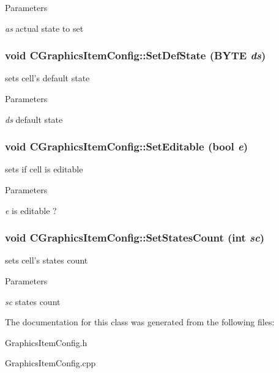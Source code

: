 \begin{DoxyParams}{Parameters}
\item[{\em as}]actual state to set \end{DoxyParams}
\hypertarget{classCGraphicsItemConfig_ace5b4e90b7f89113005c2b8340e40ddb}{
\subsubsection[{SetDefState}]{\setlength{\rightskip}{0pt plus 5cm}void CGraphicsItemConfig::SetDefState (BYTE {\em ds})}}
\label{classCGraphicsItemConfig_ace5b4e90b7f89113005c2b8340e40ddb}
sets cell's default state


\begin{DoxyParams}{Parameters}
\item[{\em ds}]default state \end{DoxyParams}
\hypertarget{classCGraphicsItemConfig_a63436e6b3eb1e9ffe7ba7b43a9b89442}{
\subsubsection[{SetEditable}]{\setlength{\rightskip}{0pt plus 5cm}void CGraphicsItemConfig::SetEditable (bool {\em e})}}
\label{classCGraphicsItemConfig_a63436e6b3eb1e9ffe7ba7b43a9b89442}
sets if cell is editable


\begin{DoxyParams}{Parameters}
\item[{\em e}]is editable ? \end{DoxyParams}
\hypertarget{classCGraphicsItemConfig_ae1a6fc47d35017d5ac76f328f323bce7}{
\subsubsection[{SetStatesCount}]{\setlength{\rightskip}{0pt plus 5cm}void CGraphicsItemConfig::SetStatesCount (int {\em sc})}}
\label{classCGraphicsItemConfig_ae1a6fc47d35017d5ac76f328f323bce7}
sets cell's states count


\begin{DoxyParams}{Parameters}
\item[{\em sc}]states count \end{DoxyParams}


The documentation for this class was generated from the following files:\begin{DoxyCompactItemize}
\item 
GraphicsItemConfig.h\item 
GraphicsItemConfig.cpp\end{DoxyCompactItemize}
